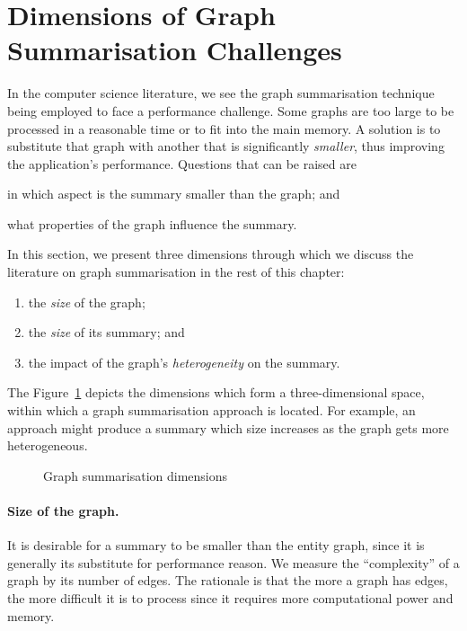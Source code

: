 \section{Dimensions of Graph Summarisation Challenges}

In the computer science literature, we see the graph summarisation technique being employed to face a performance challenge. Some graphs are too large to be processed in a reasonable time or to fit into the main memory. A solution is to substitute that graph with another that is significantly \emph{smaller}, thus improving the application's performance. Questions that can be raised are
\begin{inparaenum}[(a)]
\item in which aspect is the summary smaller than the graph; and
\item what properties of the graph influence the summary.
\end{inparaenum}
In this section, we present three dimensions through which we discuss the literature on graph summarisation in the rest of this chapter:
\begin{enumerate}
\item the \emph{size} of the graph;
\item the \emph{size} of its summary; and
\item the impact of the graph's \emph{heterogeneity} on the summary.
\end{enumerate}
The Figure~\ref{chap3:review:fig:gs-axis} depicts the dimensions which form a three-dimensional space, within which a graph summarisation approach is located. For example, an approach might produce a summary which size increases as the graph gets more heterogeneous.

\begin{figure}
	\centering
	\resizebox{.5\textwidth}{!}{
		
	}
	\caption{Graph summarisation dimensions}
	\label{chap3:review:fig:gs-axis}
\end{figure}

\paragraph{Size of the graph.}

It is desirable for a summary to be smaller than the entity graph, since it is generally its substitute for performance reason. We measure the ``complexity'' of a graph by its number of edges. The rationale is that the more a graph has edges, the more difficult it is to process since it requires more computational power and memory.
%

